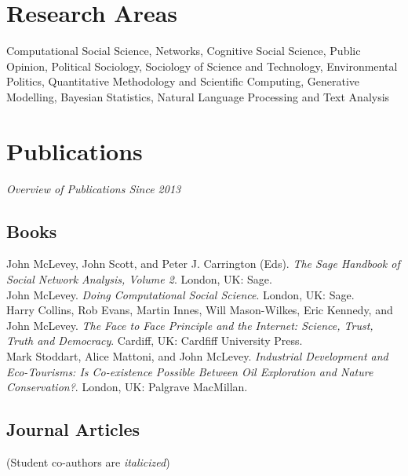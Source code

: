 \documentclass[11pt, a4paper]{article}
\newcommand{\note}[1]{\marginnote{\scriptsize #1}}
\begin{document}
\vspace{-24pt}
\section*{Research Areas}
Computational Social Science, Networks, Cognitive Social Science, Public
Opinion, Political Sociology, Sociology of Science and Technology,
Environmental Politics, Quantitative Methodology and Scientific
Computing, Generative Modelling, Bayesian Statistics, Natural Language
Processing and Text Analysis

\vspace{-12pt}
\section*{Publications}

\begin{table}[H]
\raggedleft
\caption*{\raggedleft \emph{Overview of Publications Since 2013}}

\end{table}

\subsection*{Books}
\noindent
  \note{2023}John McLevey, John Scott, and Peter J. Carrington
(Eds). \emph{The Sage Handbook of Social Network Analysis, Volume
2}. London, UK: Sage. 
  \\[.2cm]
  \note{2022}John McLevey. \emph{Doing Computational Social
Science}. London, UK: Sage. 
  \\[.2cm]
  \note{2022}Harry Collins, Rob Evans, Martin Innes, Will Mason-Wilkes,
Eric Kennedy, and John McLevey. \emph{The Face to Face Principle and the
Internet: Science, Trust, Truth and Democracy}. Cardiff, UK: Cardfiff
University Press. 
  \\[.2cm]
  \note{2020}Mark Stoddart, Alice Mattoni, and John
McLevey. \emph{Industrial Development and Eco-Tourisms: Is Co-existence
Possible Between Oil Exploration and Nature Conservation?}. London,
UK: Palgrave MacMillan. 
  \\[.2cm]

\subsection*{Journal Articles}
(Student co-authors are \emph{italicized})\\
\end{document}
